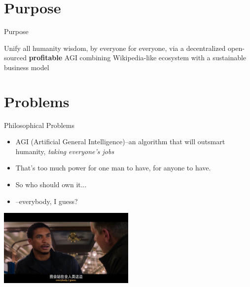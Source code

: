 \documentclass{beamer}
\begin{document}
\section{Purpose}
\begin{frame}{Purpose}
\begin{center}
Unify all humanity wisdom, by everyone for everyone, via a decentralized open-sourced \textbf{profitable} AGI 
\linebreak
\linebreak
{\scriptsize combining Wikipedia-like ecosystem with a sustainable business model}
\end{center}
\end{frame}

\section{Problems}
\begin{frame}{Philosophical Problems}
\begin{itemize}
    \item AGI (Artificial General Intelligence)--an algorithm that will outsmart humanity, \emph{taking everyone's jobs}
    \item That's too much power for one man to have, for anyone to have.
    \item So who should own it...
    \item --everybody, I guess?
\end{itemize}
\begin{center}
\includegraphics[width=0.5\textwidth]{images/everybody.JPG}
\end{center}
\end{frame}
\end{document}
